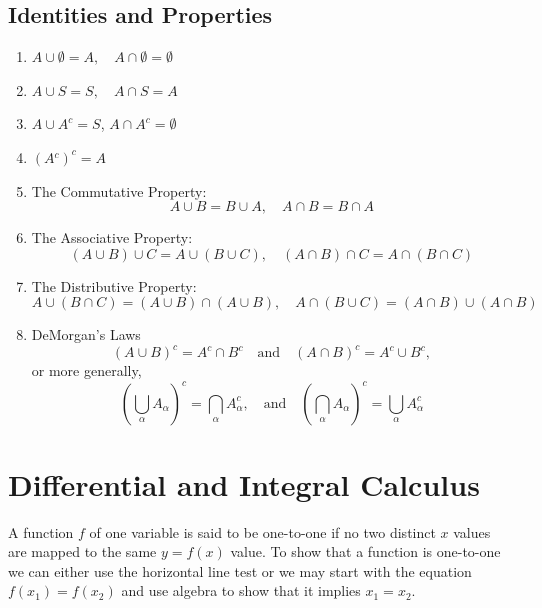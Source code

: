 \documentclass[captions=tableheading]{scrbook}
\begin{document}
\begin{example}
\subsection{Identities and Properties}
\label{sec-21-1-2}


\begin{enumerate}
\item \(A\cup\emptyset=A,\quad A\cap\emptyset=\emptyset\)
\item \(A\cup S=S,\quad A\cap S=A\)
\item \(A\cup A^{c}=S\), \(A\cap A^{c}=\emptyset\)
\item \((A{}^{c})^{c}=A\)
\item The Commutative Property: 
   \begin{equation}
   A \cup B = B\cup A,\quad A\cap B = B\cap A
   \end{equation}
\item The Associative Property: 
   \begin{equation}
   (A\cup B)\cup C=A\cup(B\cup C),\quad (A\cap B)\cap C=A\cap(B\cap C)
   \end{equation}
\item The Distributive Property: 
   \begin{equation}
   A\cup(B\cap C)=(A\cup B)\cap(A\cup B),\quad A\cap(B\cup C)=(A\cap B)\cup(A\cap B)
   \end{equation}
\item DeMorgan's Laws
   \begin{equation}
   (A\cup B)^{c}=A^{c}\cap B^{c}\quad \mbox{and}\quad (A\cap B)^{c}=A^{c}\cup B^{c},
   \end{equation}
   or more generally,
   \begin{equation}
   \left(\bigcup_{\alpha}A_{\alpha}\right)^{c}=\bigcap_{\alpha}A_{\alpha}^{c},\quad \mbox{and}\quad \left(\bigcap_{\alpha}A_{\alpha}\right)^{c}=\bigcup_{\alpha}A_{\alpha}^{c}
   \end{equation}
\end{enumerate}
\section{Differential and Integral Calculus}
\label{sec-21-2}
\label{sec-Differential-and-Integral}


A function \(f\) of one variable is said to be one-to-one if no two distinct \(x\) values are mapped to the same \(y=f(x)\) value. To show that a function is one-to-one we can either use the horizontal line test or we may start with the equation \(f(x_{1}) = f(x_{2})\) and use algebra to show that it implies \(x_{1} = x_{2}\).

\end{example}
\end{document}
